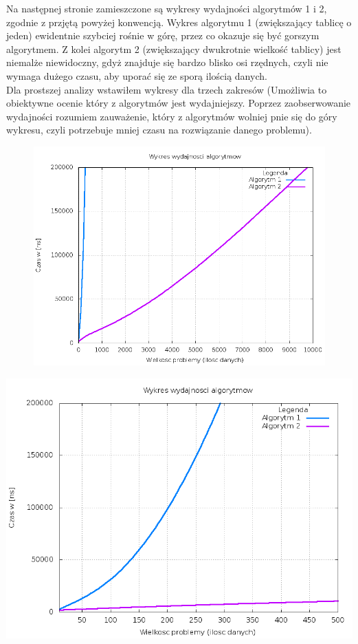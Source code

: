 \documentclass[a4paper,12pt]{article}
\begin{document}
Na następnej stronie zamieszczone są wykresy wydajności algorytmów 1 i 2, zgodnie z przjętą
powyżej konwencją. Wykres algorytmu 1 (zwiększający tablicę o jeden) ewidentnie
szybciej rośnie w górę, przez co okazuje się być gorszym algorytmem. Z kolei
algorytm 2 (zwiększający dwukrotnie wielkość tablicy) jest niemalże niewidoczny,
gdyż znajduje się bardzo blisko osi rzędnych, czyli nie wymaga dużego
czasu, aby uporać się ze sporą ilością danych. \\Dla prostszej analizy wstawiłem
wykresy dla trzech zakresów (Umożliwia to obiektywne ocenie który z algorytmów jest wydajniejszy. Poprzez
zaobserwowanie wydajności rozumiem zauważenie, który z algorytmów wolniej pnie się do góry wykresu, czyli
potrzebuje mniej czasu na rozwiązanie danego problemu).
\begin{center}
\begin{figure}[h]
	\begin{center}
		\includegraphics[scale=0.4]{Eksperyment.png}
	\end{center}
\end{figure}
\includegraphics[scale=0.4]{Eksperyment-1.png}

\end{center}
\end{document}
